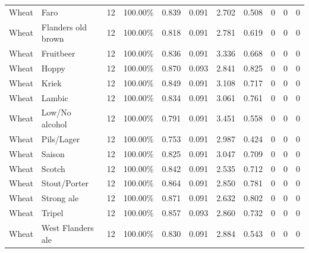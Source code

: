 {\begin{longtable}{llrrrrrrrrr}
Wheat & Faro & 12 & 100.00\% & 0.839 & 0.091 & 2.702 & 0.508 & 0 & 0 & 0 \\
Wheat & Flanders old brown & 12 & 100.00\% & 0.818 & 0.091 & 2.781 & 0.619 & 0 & 0 & 0 \\
Wheat & Fruitbeer & 12 & 100.00\% & 0.836 & 0.091 & 3.336 & 0.668 & 0 & 0 & 0 \\
Wheat & Hoppy & 12 & 100.00\% & 0.870 & 0.093 & 2.841 & 0.825 & 0 & 0 & 0 \\
Wheat & Kriek & 12 & 100.00\% & 0.849 & 0.091 & 3.108 & 0.717 & 0 & 0 & 0 \\
Wheat & Lambic & 12 & 100.00\% & 0.834 & 0.091 & 3.061 & 0.761 & 0 & 0 & 0 \\
Wheat & Low/No alcohol & 12 & 100.00\% & 0.791 & 0.091 & 3.451 & 0.558 & 0 & 0 & 0 \\
Wheat & Pils/Lager & 12 & 100.00\% & 0.753 & 0.091 & 2.987 & 0.424 & 0 & 0 & 0 \\
Wheat & Saison & 12 & 100.00\% & 0.825 & 0.091 & 3.047 & 0.709 & 0 & 0 & 0 \\
Wheat & Scotch & 12 & 100.00\% & 0.842 & 0.091 & 2.535 & 0.712 & 0 & 0 & 0 \\
Wheat & Stout/Porter & 12 & 100.00\% & 0.864 & 0.091 & 2.850 & 0.781 & 0 & 0 & 0 \\
Wheat & Strong ale & 12 & 100.00\% & 0.871 & 0.091 & 2.632 & 0.802 & 0 & 0 & 0 \\
Wheat & Tripel & 12 & 100.00\% & 0.857 & 0.093 & 2.860 & 0.732 & 0 & 0 & 0 \\
Wheat & West Flanders ale & 12 & 100.00\% & 0.830 & 0.091 & 2.884 & 0.543 & 0 & 0 & 0 \\
\end{longtable}
}
